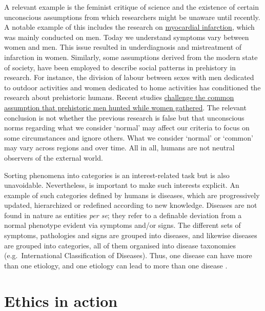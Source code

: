 \documentclass[
]{book}
\begin{document}
A relevant example is the feminist critique of science \citep{sep-feminist-science} and the existence of certain unconscious assumptions from which researchers might be unaware until recently. A notable example of this includes the research on \href{https://en.wikipedia.org/wiki/Cardiovascular_disease_in_women\#History}{myocardial infarction}, which was mainly conducted on men. Today we understand symptoms vary between women and men. This issue resulted in underdiagnosis and mistreatment of infarction in women. Similarly, some assumptions derived from the modern state of society, have been employed to describe social patterns in prehistory in research. For instance, the division of labour between sexes with men dedicated to outdoor activities and women dedicated to home activities has conditioned the research about prehistoric humans. Recent studies \href{https://www.nationalgeographic.com/science/article/prehistoric-female-hunter-discovery-upends-gender-role-assumptions}{challenge the common assumption that prehistoric men hunted while women gathered}. The relevant conclusion is not whether the previous research is false but that unconscious norms regarding what we consider `normal' may affect our criteria to focus on some circumstances and ignore others. What we consider `normal' or `common' may vary across regions and over time. All in all, humans are not neutral observers of the external world.

Sorting phenomena into categories is an interest-related task \citep{johansson2016philosophy} but is also unavoidable. Nevertheless, is important to make such interests explicit. An example of such categories defined by humans is diseases, which are progressively updated, hierarchized or redefined according to new knowledge. Diseases are not found in nature as entities \emph{per se}; they refer to a definable deviation from a normal phenotype evident via symptoms and/or signs. The different sets of symptoms, pathologies and signs are grouped into diseases, and likewise diseases are grouped into categories, all of them organised into disease taxonomies (e.g.~International Classification of Diseases). Thus, one disease can have more than one etiology, and one etiology can lead to more than one disease \citep{vega2021hume}.

\hypertarget{ethics-in-action}{%
\section{Ethics in action}\label{ethics-in-action}}
\end{document}
